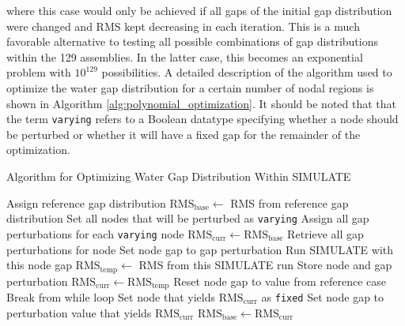 \documentclass{article}
\begin{document}
where this case would only be achieved if all gaps of the initial gap distribution were changed and RMS kept decreasing in each iteration. This is a much favorable alternative to testing all possible combinations of gap distributions within the 129 assemblies. In the latter case, this becomes an exponential problem with $10^{129}$ possibilities. A detailed description of the algorithm used to optimize the water gap distribution for a certain number of nodal regions is shown in Algorithm \ref{alg:polynomial_optimization}. It should be noted that that the term \texttt{varying} refers to a Boolean datatype specifying whether a node should be perturbed or whether it will have a fixed gap for the remainder of the optimization.

\begin{algorithm}[!htb]
\caption{Algorithm for Optimizing Water Gap Distribution Within SIMULATE}
\label{alg:polynomial_optimization}
\begin{algorithmic}[1]
  \State\label{st:one} Assign reference gap distribution 
  \State $\text{RMS}_{\text{base}}\leftarrow$ RMS from reference gap distribution
  \State Set all nodes that will be perturbed as \texttt{varying}
  \State Assign all gap perturbations for each \texttt{varying} node
    \State $\text{RMS}_{\text{curr}}\leftarrow\text{RMS}_{\text{base}}$ 
        \State Retrieve all gap perturbations for node
          \State Set node gap to gap perturbation
          \State Run SIMULATE with this node gap
          \State $\text{RMS}_{\text{temp}}\leftarrow$ RMS from this SIMULATE run
           
            \State Store node and gap perturbation
            \State $\text{RMS}_{\text{curr}}\leftarrow\text{RMS}_{\text{temp}}$
          \EndIf
        \EndFor
        \State Reset node gap to value from reference case
      \EndIf
    \EndFor
     
      \State Break from while loop
    \Else {}
      \State Set node that yields $\text{RMS}_{\text{curr}}$ as \texttt{fixed} 
      \State Set node gap to perturbation value that yields $\text{RMS}_{\text{curr}}$
      \State $\text{RMS}_{\text{base}}\leftarrow\text{RMS}_{\text{curr}}$
    \EndIf
  \EndWhile
\end{algorithmic}
\end{algorithm}
\end{document}
